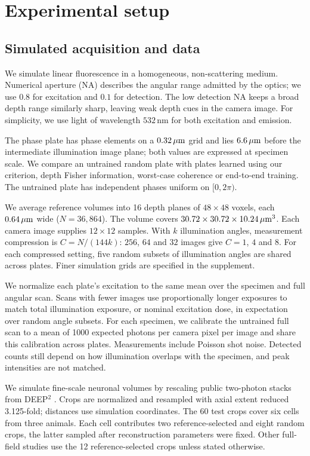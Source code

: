 \section{Experimental setup}
\label{sec:setup}

\subsection{Simulated acquisition and data}

We simulate linear fluorescence in a homogeneous, non-scattering medium. Numerical aperture (NA) describes the angular range admitted by the optics; we use $0.8$ for excitation and $0.1$ for detection. The low detection NA keeps a broad depth range similarly sharp, leaving weak depth cues in the camera image. For simplicity, we use light of wavelength $532$\,nm for both excitation and emission.

The phase plate has phase elements on a $0.32\,\mu\mathrm{m}$ grid and lies $6.6\,\mu\mathrm{m}$ before the intermediate illumination image plane; both values are expressed at specimen scale. We compare an untrained random plate with plates learned using our criterion, depth Fisher information, worst-case coherence or end-to-end training. The untrained plate has independent phases uniform on $[0,2\pi)$.

We average reference volumes into 16 depth planes of $48\times48$ voxels, each $0.64\,\mu\mathrm{m}$ wide ($N=36{,}864$). The volume covers $30.72\times30.72\times10.24\,\mu\mathrm{m}^3$. Each camera image supplies $12\times12$ samples. With $k$ illumination angles, measurement compression is $C=N/(144k)$: $256$, $64$ and $32$ images give $C=1$, $4$ and $8$. For each compressed setting, five random subsets of illumination angles are shared across plates. Finer simulation grids are specified in the supplement.

We normalize each plate's excitation to the same mean over the specimen and full angular scan. Scans with fewer images use proportionally longer exposures to match total illumination exposure, or nominal excitation dose, in expectation over random angle subsets. For each specimen, we calibrate the untrained full scan to a mean of 1000 expected photons per camera pixel per image and share this calibration across plates. Measurements include Poisson shot noise. Detected counts still depend on how illumination overlaps with the specimen, and peak intensities are not matched.

We simulate fine-scale neuronal volumes by rescaling public two-photon stacks from DEEP$^2$ \cite{wijethilake2023,wijethilake2023data}. Crops are normalized and resampled with axial extent reduced 3.125-fold; distances use simulation coordinates. The 60 test crops cover six cells from three animals. Each cell contributes two reference-selected and eight random crops, the latter sampled after reconstruction parameters were fixed. Other full-field studies use the 12 reference-selected crops unless stated otherwise.

